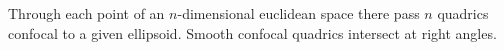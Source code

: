 Through each point of an $n$-dimensional euclidean space there pass $n$ quadrics confocal to a given ellipsoid. Smooth confocal quadrics intersect at right angles.

